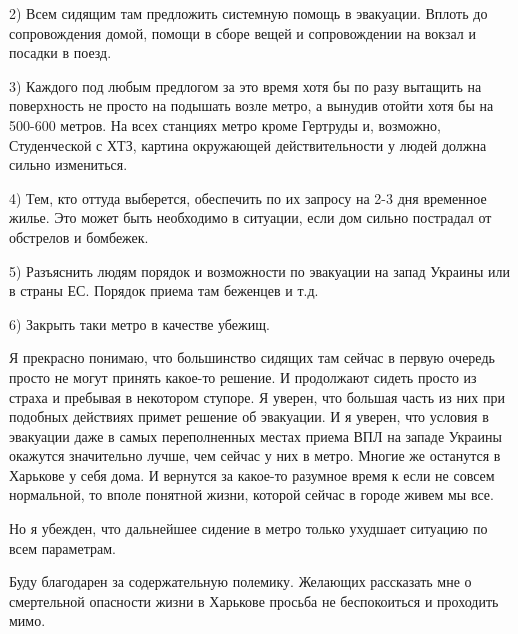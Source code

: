 2) Всем сидящим там предложить системную помощь в эвакуации. Вплоть до
сопровождения домой, помощи в сборе вещей и сопровождении на вокзал и посадки в
поезд. 

3) Каждого под любым предлогом за это время хотя бы по разу вытащить на
поверхность не просто на подышать возле метро, а вынудив отойти хотя бы на
500-600 метров. На всех станциях метро кроме Гертруды и, возможно, Студенческой
с ХТЗ, картина окружающей действительности у людей должна сильно измениться. 

4) Тем, кто оттуда выберется, обеспечить по их запросу на 2-3 дня временное
жилье. Это может быть необходимо в ситуации, если дом сильно пострадал от
обстрелов и бомбежек. 

5) Разъяснить людям порядок и возможности по эвакуации на запад Украины или в
страны ЕС. Порядок приема там беженцев и т.д. 

6) Закрыть таки метро в качестве убежищ. 

Я прекрасно понимаю, что большинство сидящих там сейчас в первую очередь просто
не могут принять какое-то решение. И продолжают сидеть просто из страха и
пребывая в некотором ступоре. Я уверен, что большая часть из них при подобных
действиях примет решение об эвакуации. И я уверен, что условия в эвакуации даже
в самых переполненных местах приема ВПЛ на западе Украины окажутся значительно
лучше, чем сейчас у них в метро. Многие же останутся в Харькове у себя дома. И
вернутся за какое-то разумное время к если не совсем нормальной, то вполе
понятной жизни, которой сейчас в городе живем мы все. 

Но я убежден, что дальнейшее сидение в метро только ухудшает ситуацию по всем
параметрам. 

Буду благодарен за содержательную полемику. Желающих рассказать мне о
смертельной опасности жизни в Харькове просьба не беспокоиться и проходить
мимо.

